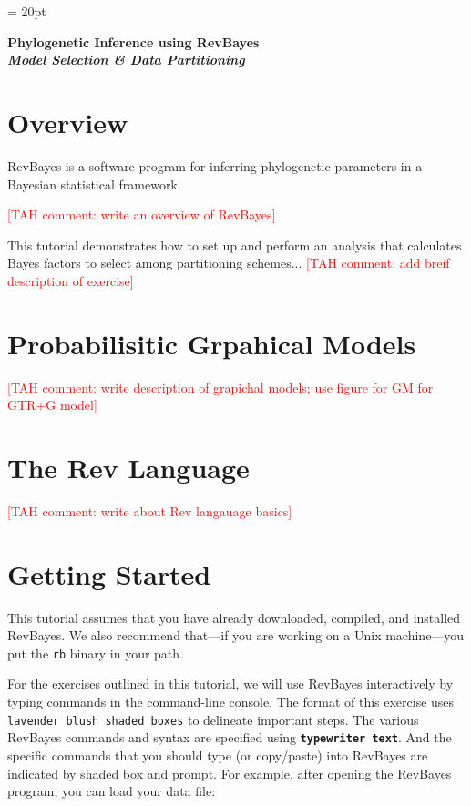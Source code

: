 \documentclass[11pt]{article}
\newcommand{\taha}[1]{{\textcolor{red}{[TAH comment: #1]}}} %
\newcommand{\cl}[1]{{\texttt{\textbf{#1}}}}
\begin{document}
\renewcommand{\headrulewidth}{0.5pt}
\headsep = 20pt
\lhead{ }

\thispagestyle{plain}
\begin{center}

\textbf{\LARGE Phylogenetic Inference using RevBayes}\\\vspace{2mm}
\textbf{\it{\Large Model Selection \& Data Partitioning}}\\\vspace{2mm}
\end{center}

\section*{Overview}

RevBayes is a software program for inferring phylogenetic parameters in a Bayesian statistical framework. 
 
\taha{write an overview of RevBayes}

This tutorial demonstrates how to set up and perform an analysis that calculates Bayes factors to select among partitioning schemes...
\taha{add breif description of exercise}


\bigskip
\section*{Probabilisitic Grpahical Models}
\taha{write description of grapichal models; use figure for GM for GTR+G model}

\bigskip
\section*{The Rev Language}
\taha{write about Rev langauage basics}

\bigskip
\section*{Getting Started}

This tutorial assumes that you have already downloaded, compiled, and installed RevBayes. 
We also recommend that---if you are working on a Unix machine---you put the {\tt rb} binary in your path.

For the exercises outlined in this tutorial, we will use RevBayes interactively by typing commands in the command-line console.
The format of this exercise uses \colorbox{shadecolor}{\tt lavender blush shaded boxes} to delineate important steps. 
The various RevBayes commands and syntax are specified using \cl{typewriter text}. And the specific commands that you should type (or copy/paste) into RevBayes are indicated by shaded box and prompt. For example, after opening the RevBayes program, you can load your data file:
\end{document}
